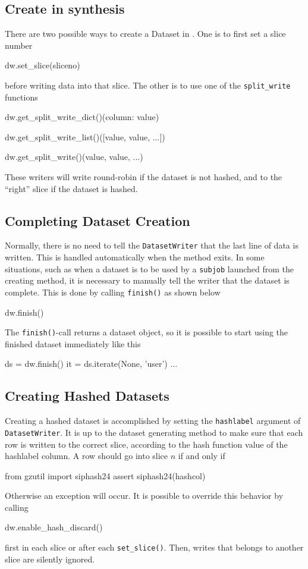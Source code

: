 \subsection{Create in synthesis}

There are two possible ways to create a Dataset in \synthesis.  One is
to first set a slice number
\begin{python}
dw.set_slice(sliceno)
\end{python}
before writing data into that slice.  The other is to use one of
the \texttt{split\_write} functions
\begin{python}
dw.get_split_write_dict()({column: value})

dw.get_split_write_list()([value, value, ...])

dw.get_split_write()(value, value, ...)
\end{python}
These writers will write round-robin if the dataset is not hashed, and
to the ``right'' slice if the dataset is hashed.



\subsection{Completing Dataset Creation}
Normally, there is no need to tell the \texttt{DatasetWriter} that the
last line of data is written.  This is handled automatically when the
method exits.  In some situations, such as when a dataset is to be
used by a \texttt{subjob} launched from the creating method, it is
necessary to manually tell the writer that the dataset is complete.
This is done by calling \texttt{finish()} as shown below
\begin{python}
dw.finish()
\end{python}
The \texttt{finish()}-call returns a dataset object, so it is possible
to start using the finished dataset immediately like this
\begin{python}
ds = dw.finish()
it = ds.iterate(None, 'user')
...
\end{python}



\subsection{Creating Hashed Datasets}
Creating a hashed dataset is accomplished by setting
the \texttt{hashlabel} argument of \texttt{DatasetWriter}.  It is up
to the dataset generating method to make sure that each row is written
to the correct slice, according to the hash function value of the
hashlabel column.  A row should go into slice $n$ if and only if
\begin{python}
from gzutil import siphash24
assert siphash24(hashcol) %
\end{python}
Otherwise an exception will occur.  It is possible to override this
behavior by calling
\begin{python}
dw.enable_hash_discard()
\end{python}
first in each slice or after each \texttt{set\_slice()}.  Then, writes
that belongs to another slice are silently ignored.



